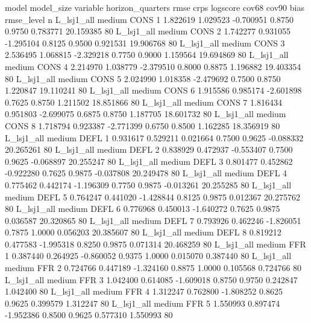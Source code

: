          model model_size variable  horizon_quarters      rmse     crps  logscore  cov68  cov90      bias  rmse_level  n
    L_lsj1_all     medium     CONS                 1  1.822619 1.029523 -0.700951 0.8750 0.9750  0.783771   20.159385 80
    L_lsj1_all     medium     CONS                 2  1.742277 0.931055 -1.295104 0.8125 0.9500  0.921531   19.906768 80
    L_lsj1_all     medium     CONS                 3  2.536495 1.068815 -2.329218 0.7750 0.9000  1.159564   19.694869 80
    L_lsj1_all     medium     CONS                 4  2.214970 1.038779 -2.379510 0.8000 0.8875  1.196882   19.403354 80
    L_lsj1_all     medium     CONS                 5  2.024990 1.018358 -2.479692 0.7500 0.8750  1.220847   19.110241 80
    L_lsj1_all     medium     CONS                 6  1.915586 0.985174 -2.601898 0.7625 0.8750  1.211502   18.851866 80
    L_lsj1_all     medium     CONS                 7  1.816434 0.951803 -2.699075 0.6875 0.8750  1.187705   18.601732 80
    L_lsj1_all     medium     CONS                 8  1.718794 0.923387 -2.771399 0.6750 0.8500  1.162285   18.356919 80
    L_lsj1_all     medium     DEFL                 1  0.931617 0.529211  0.021664 0.7500 0.9625 -0.088332   20.265261 80
    L_lsj1_all     medium     DEFL                 2  0.838929 0.472937 -0.553407 0.7500 0.9625 -0.068897   20.255247 80
    L_lsj1_all     medium     DEFL                 3  0.801477 0.452862 -0.922280 0.7625 0.9875 -0.037808   20.249478 80
    L_lsj1_all     medium     DEFL                 4  0.775462 0.442174 -1.196309 0.7750 0.9875 -0.013261   20.255285 80
    L_lsj1_all     medium     DEFL                 5  0.764247 0.441020 -1.428844 0.8125 0.9875  0.012367   20.275762 80
    L_lsj1_all     medium     DEFL                 6  0.776968 0.450013 -1.640272 0.7625 0.9875  0.036587   20.320865 80
    L_lsj1_all     medium     DEFL                 7  0.793926 0.462246 -1.826051 0.7875 1.0000  0.056203   20.385607 80
    L_lsj1_all     medium     DEFL                 8  0.819212 0.477583 -1.995318 0.8250 0.9875  0.071314   20.468259 80
    L_lsj1_all     medium      FFR                 1  0.387440 0.264925 -0.860052 0.9375 1.0000  0.015070    0.387440 80
    L_lsj1_all     medium      FFR                 2  0.724766 0.447189 -1.324160 0.8875 1.0000  0.105568    0.724766 80
    L_lsj1_all     medium      FFR                 3  1.042400 0.614085 -1.609018 0.8750 0.9750  0.242847    1.042400 80
    L_lsj1_all     medium      FFR                 4  1.312247 0.762800 -1.808252 0.8625 0.9625  0.399579    1.312247 80
    L_lsj1_all     medium      FFR                 5  1.550993 0.897474 -1.952386 0.8500 0.9625  0.577310    1.550993 80
